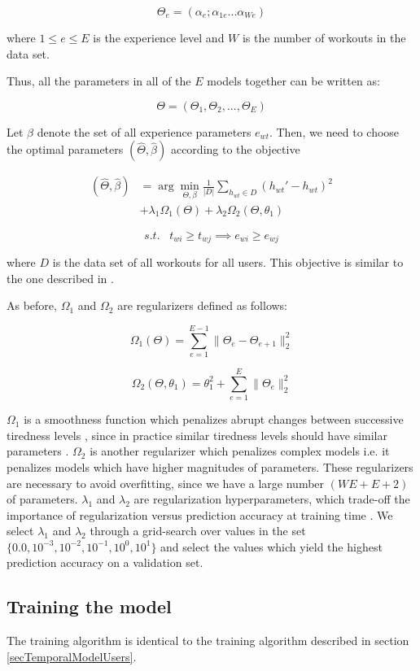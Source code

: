 \documentclass{acm_proc_article-sp}
\begin{document}
$$\Theta_e = (\alpha_e; \alpha_{1e}...\alpha_{We})$$

where $1 \leq e \leq E$ is the experience level and $W$ is the number of workouts in the data set.

Thus, all the parameters in all of the $E$ models together can be written as:

$$\Theta = (\Theta_1, \Theta_2,..., \Theta_E)$$

Let $\beta$ denote the set of all experience parameters $e_{wt}$. Then, we need to choose the optimal parameters $(\hat{\Theta}, \hat{\beta})$ according to the objective

\begin{align}
\label{eqnObjective2}
(\hat{\Theta}, \hat{\beta})  &= \arg\min_{\Theta,\beta}\frac{1}{|D|} \sum_{h_{wt} \in D}(h_{wt}' - h_{wt})^2 \nonumber \\
 & + \lambda_1\Omega_1(\Theta) + \lambda_2\Omega_2(\Theta, \theta_1)
\end{align}

$$s.t. \; \; \; t_{wi} \geq t_{wj} \implies e_{wi} \geq e_{wj} $$

where $D$ is the data set of all workouts for all users. This objective is similar to the one described in \cite{www13}.

As before, $\Omega_1$ and $\Omega_2$ are regularizers defined as follows:

$$\Omega_1(\Theta) = \sum_{e=1}^{E-1}{\|\Theta_e - \Theta_{e+1}\|_2^2}$$

$$\Omega_2(\Theta, \theta_1) = \theta_1^2 + \sum_{e=1}^{E}{\|\Theta_e \|_2^2}$$

$\Omega_1$ is a smoothness function which penalizes abrupt changes between successive tiredness levels \cite{www13}, since in practice similar tiredness levels should have similar parameters \cite{www13}. $\Omega_2$ is another regularizer which penalizes complex models i.e. it penalizes models which have higher magnitudes of parameters. These regularizers are necessary to avoid overfitting, since we have a large number $(WE + E + 2)$ of parameters. $\lambda_1$ and $\lambda_2$ are regularization hyperparameters, which trade-off the importance of regularization versus prediction accuracy at training time \cite{www13}. We select $\lambda_1$ and $\lambda_2$ through a grid-search over values in the set $\{0.0, 10^{-3}, 10^{-2}, 10^{-1}, 10^0, 10^1\}$ and select the values which yield the highest prediction accuracy on a validation set.

\subsection{Training the model}
The training algorithm is identical to the training algorithm described in section \ref{secTemporalModelUsers}.
\end{document}
